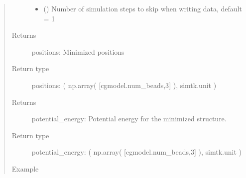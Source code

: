 \documentclass[letterpaper,12pt,english,openany,oneside]{sphinxmanual}
\begin{document}
\begin{fulllineitems}
\begin{quote}
\begin{description}
\begin{itemize}
\item {} 
 () \textendash{} Number of simulation steps to skip when writing data, default = 1

\end{itemize}

\item[{Returns}] \leavevmode
positions: Minimized positions

\item[{Return type}] \leavevmode

positions:  ( np.array( {[}cgmodel.num\_beads,3{]} ), simtk.unit )


\item[{Returns}] \leavevmode
potential\_energy: Potential energy for the minimized structure.

\item[{Return type}] \leavevmode

potential\_energy:  ( np.array( {[}cgmodel.num\_beads,3{]} ), simtk.unit )


\item[{Example}] \leavevmode
\end{description}\end{quote}


\end{fulllineitems}
\end{document}
